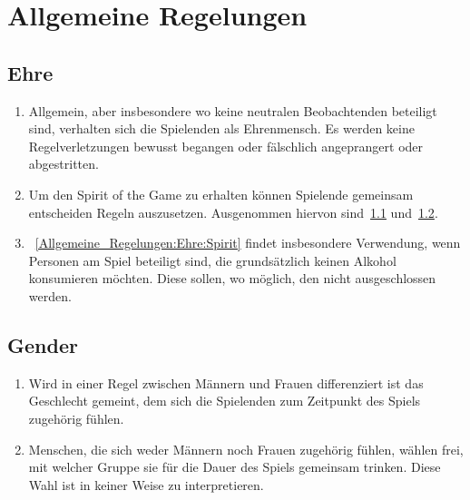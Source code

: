 \chapter{Allgemeine Regelungen}\label{Allgemeine_Regelungen}

\section{Ehre}\label{Allgemeine_Regelungen:Ehre}
\begin{enumerate}[label={(\arabic*)}]
	\item Allgemein, aber insbesondere wo keine neutralen Beobachtenden beteiligt sind, verhalten sich die Spielenden als Ehrenmensch.
	Es werden keine Regelverletzungen bewusst begangen oder fälschlich angeprangert oder abgestritten.
	
	\item\label{Allgemeine_Regelungen:Ehre:Spirit}
	Um den \glqq{} Spirit of the Game\grqq{} zu erhalten können Spielende gemeinsam entscheiden Regeln auszusetzen.
	Ausgenommen hiervon sind~\ref{Allgemeine_Regelungen:Ehre} und~\ref{Allgemeine_Regelungen:Gender}.
	
	\item
	~\ref{Allgemeine_Regelungen:Ehre:Spirit} findet insbesondere Verwendung, wenn Personen am Spiel beteiligt sind, die grundsätzlich keinen Alkohol konsumieren möchten.
	Diese sollen, wo möglich, den nicht ausgeschlossen werden.
\end{enumerate}

\section{Gender}\label{Allgemeine_Regelungen:Gender}
\begin{enumerate}[label={(\arabic*)}]	
	\item
	Wird in einer Regel zwischen Männern und Frauen differenziert ist das Geschlecht gemeint, dem sich die Spielenden zum Zeitpunkt des Spiels zugehörig fühlen.
	
	\item
	Menschen, die sich weder Männern noch Frauen zugehörig fühlen, wählen frei, mit welcher Gruppe sie für die Dauer des Spiels gemeinsam trinken.
	Diese Wahl ist in keiner Weise zu interpretieren.
\end{enumerate}
	
